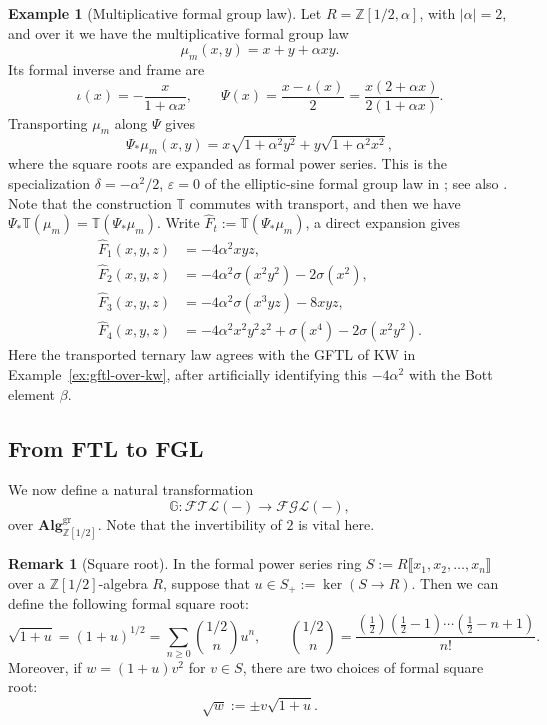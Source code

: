 \documentclass[a4paper]{amsart}
\theoremstyle{plain}
\theoremstyle{definition}
\newtheorem{example}[subsubsection]{Example}
\newtheorem{remark}[subsubsection]{Remark}
\newcommand{\KW}{\mathrm{KW}}
\newcommand{\ZZ}{\mathbb{Z}}
\renewcommand{\ge}{\geqslant}
\begin{document}
\begin{example}[Multiplicative formal group law]\label{ex:multiplicative-fgl-kw}
	Let $R=\ZZ[1/2,\alpha]$, with $|\alpha|=2$, and over it we have the multiplicative formal group law
	\[
		\mu_m(x,y)=x+y+\alpha xy.
	\]
	Its formal inverse and frame are
	\[
		\iota(x)=-\frac{x}{1+\alpha x},\qquad
		\Psi(x)=\frac{x-\iota(x)}{2}=\frac{x(2+\alpha x)}{2(1+\alpha x)}.
	\]
	Transporting $\mu_m$ along $\Psi$ gives
	\[
		\Psi_*\mu_m(x,y)
		=x\sqrt{1+\alpha^2y^2}+y\sqrt{1+\alpha^2x^2},
	\]
	where the square roots are expanded as formal power series. This is the specialization $\delta=-\alpha^2/2$, $\varepsilon=0$ of the elliptic-sine formal group law in \cite[Example~20]{buchstaber2010elliptic}; see also \cite{koyama2013formal}. Note that the construction $\mathbb{T}$ commutes with transport, and then we have $\Psi_*\mathbb{T}(\mu_m)=\mathbb{T}(\Psi_*\mu_m)$.
	Write $\widehat{F}_t:=\mathbb{T}(\Psi_*\mu_m)$, a direct expansion gives
	\[
		\begin{aligned}
			\widehat{F}_{1}(x,y,z) & = -4\alpha^2 xyz,                                        \\
			\widehat{F}_{2}(x,y,z) & = -4\alpha^2 \sigma(x^2y^2) - 2\sigma(x^2),              \\
			\widehat{F}_{3}(x,y,z) & = -4\alpha^2 \sigma(x^3yz)-8xyz,                         \\
			\widehat{F}_{4}(x,y,z) & = -4\alpha^2 x^2y^2z^2 + \sigma(x^4) - 2\sigma(x^2 y^2).
		\end{aligned}
	\]
	Here the transported ternary law agrees with the GFTL of $\KW$ in Example~\ref{ex:gftl-over-kw}, after artificially identifying this $-4\alpha^2$ with the Bott element $\beta$.
\end{example}

\subsection{From FTL to FGL}\label{subsec:from-ftl-to-fgl}
We now define a natural transformation
\[
	\mathbb{G}: \mathcal{FTL}(-) \to \mathcal{FGL}(-),
\]
over $\mathbf{Alg}^{\mathrm{gr}}_{\ZZ[1/2]}$. Note that the invertibility of $2$ is vital here.

\begin{remark}[Square root] In the formal power series ring $S:= R \llbracket x_1, x_2, \ldots, x_{n} \rrbracket$ over a $\ZZ[1/2]$-algebra $R$, suppose that $u \in S_{+}:= \ker(S \to R)$. Then we can define the following formal square root:
	\[
		\sqrt{1+u}=(1+u)^{1/2}=\sum_{n\ge 0}\binom{1/2}{n}u^n,
		\qquad
		\binom{1/2}{n}=\frac{\left(\frac12\right)\left(\frac12-1\right)\cdots\left(\frac12-n+1\right)}{n!}.
	\]
	Moreover, if $w = (1+u)v^{2}$ for $v \in S$, there are two choices of formal square root:
	\[
		\sqrt{w} := \pm v\sqrt{1+u}.
	\]
\end{remark}
\end{document}
